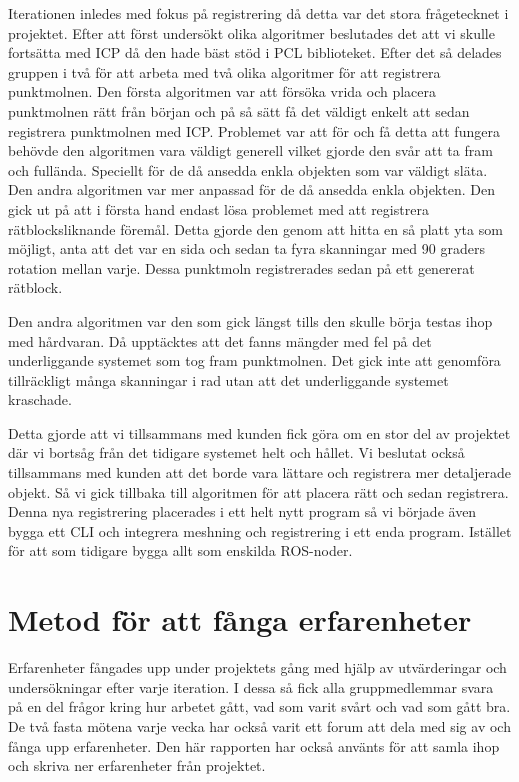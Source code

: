 Iterationen inledes med fokus på registrering då detta var det stora frågetecknet i projektet. Efter att först undersökt olika algoritmer beslutades det att vi skulle fortsätta med ICP då den hade bäst stöd i PCL biblioteket. Efter det så delades gruppen i två för att arbeta med två olika algoritmer för att registrera punktmolnen. Den första algoritmen var att försöka vrida och placera punktmolnen rätt från början och på så sätt få det väldigt enkelt att sedan registrera punktmolnen med ICP. Problemet var att för och få detta att fungera behövde den algoritmen vara väldigt generell vilket gjorde den svår att ta fram och fullända. Speciellt för de då ansedda enkla objekten som var väldigt släta. Den andra algoritmen var mer anpassad för de då ansedda enkla objekten. Den gick ut på att i första hand endast lösa problemet med att registrera rätblocksliknande föremål. Detta gjorde den genom att hitta en så platt yta som möjligt, anta att det var en sida och sedan ta fyra skanningar med 90 graders rotation mellan varje. Dessa punktmoln registrerades sedan på ett genererat rätblock. 

Den andra algoritmen var den som gick längst tills den skulle börja testas ihop med hårdvaran. Då upptäcktes att det fanns mängder med fel på det underliggande systemet som tog fram punktmolnen. Det gick inte att genomföra tillräckligt många skanningar i rad utan att det underliggande systemet kraschade. 

Detta gjorde att vi tillsammans med kunden fick göra om en stor del av projektet där vi bortsåg från det tidigare systemet helt och hållet. Vi beslutat också tillsammans med kunden att det borde vara lättare och registrera mer detaljerade objekt. Så vi gick tillbaka till algoritmen för att placera rätt och sedan registrera. Denna nya registrering placerades i ett helt nytt program så vi började även bygga ett CLI och integrera meshning och registrering i ett enda program. Istället för att som tidigare bygga allt som enskilda ROS-noder. 

\section{Metod för att fånga erfarenheter}

Erfarenheter fångades upp under projektets gång med hjälp av utvärderingar och undersökningar efter varje iteration. I dessa så fick alla gruppmedlemmar svara på en del frågor kring hur arbetet gått, vad som varit svårt och vad som gått bra. De två fasta mötena varje vecka har också varit ett forum att dela med sig av och fånga upp erfarenheter. Den här rapporten har också använts för att samla ihop och skriva ner erfarenheter från projektet. 


